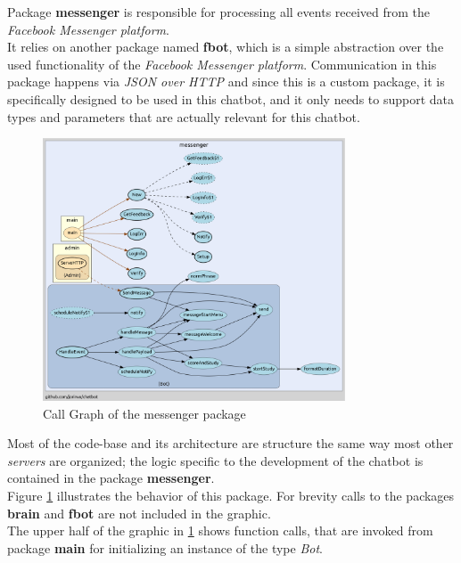 Package \textbf{messenger} is responsible for processing all events received from the \emph{Facebook Messenger platform}.
\\

It relies on another package named \textbf{fbot},
which is a simple abstraction over the used functionality of the \emph{Facebook Messenger platform}.
Communication in this package happens via \emph{JSON over HTTP} and since this is a custom package,
it is specifically designed to be used in this chatbot, and it only needs to support data types and parameters that are actually relevant for this chatbot.
\\

\begin{figure}[h]
  \centering
  \includegraphics[width=0.8\textwidth]{images/call-graph-messenger.png}
	\caption{Call Graph of the messenger package\protect\footnotemark}
	\label{fig:call-graph-messenger}
\end{figure}


Most of the code-base and its architecture are structure the same way most other \emph{servers} are organized;
the logic specific to the development of the chatbot is contained in the package \textbf{messenger}.
\\
Figure \ref{fig:call-graph-messenger} illustrates the behavior of this package.
For brevity calls to the packages \textbf{brain} and \textbf{fbot} are not included in the graphic.
\\
The upper half of the graphic in \ref{fig:call-graph-messenger} shows function calls,
that are invoked from package \textbf{main} for initializing an instance of the type \emph{Bot}.
\\

